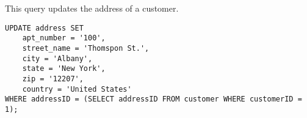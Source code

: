 This query updates the address of a customer.

\begin{lstlisting}
UPDATE address SET
    apt_number = '100',
    street_name = 'Thomspon St.',
    city = 'Albany',
    state = 'New York',
    zip = '12207',
    country = 'United States'
WHERE addressID = (SELECT addressID FROM customer WHERE customerID = 1);
\end{lstlisting}